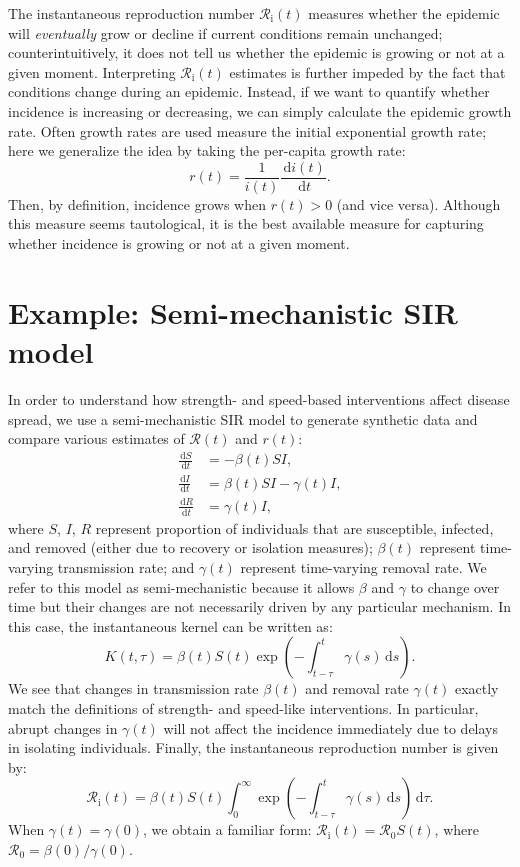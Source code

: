 \documentclass[12pt]{article}
\newcommand{\Rx}[1]{\ensuremath{{\mathcal R}_{#1}}\xspace}
\newcommand{\Ro}{\Rx{0}}
\newcommand{\Ri}{\Rx{\mathrm{i}}}
\newcommand{\RR}{\ensuremath{{\mathcal R}}\xspace}
\newcommand{\dd}[1]{\ensuremath{\, \mathrm{d}#1}}
\newcommand{\dtau}{\dd{\tau}}
\begin{document}
The instantaneous reproduction number $\Ri(t)$ measures whether the epidemic will \emph{eventually} grow or decline if current conditions remain unchanged;
counterintuitively, it does not tell us whether the epidemic is growing or not at a given moment.
Interpreting $\Ri(t)$ estimates is further impeded by the fact that conditions change during an epidemic.
Instead, if we want to quantify whether incidence is increasing or decreasing, we can simply calculate the epidemic growth rate.
Often growth rates are used measure the initial exponential growth rate; here we generalize the idea by taking the per-capita growth rate:
\begin{equation}
r(t) = \frac{1}{i(t)} \frac{\dd{i(t)}}{\dd{t}}.
\end{equation}
Then, by definition, incidence grows when $r(t) > 0$ (and vice versa).
Although this measure seems tautological, it is the best available measure for capturing whether incidence is growing or not at a given moment.

\section{Example: Semi-mechanistic SIR model}

In order to understand how strength- and speed-based interventions affect disease spread, we use a semi-mechanistic SIR model to generate synthetic data and compare various estimates of $\RR(t)$ and $r(t)$:
\begin{align}
\frac{\dd{S}}{\dd{t}} &= - \beta(t)S I, \label{eq:dSdt}\\
\frac{\dd{I}}{\dd{t}} &= \beta(t)S I - \gamma(t) I,\\
\frac{\dd{R}}{\dd{t}} &= \gamma(t) I,  \label{eq:dRdt}
\end{align}
where $S$, $I$, $R$ represent proportion of individuals that are susceptible, infected, and removed (either due to recovery or isolation measures);
$\beta(t)$ represent time-varying transmission rate; and $\gamma(t)$ represent time-varying removal rate.
We refer to this model as semi-mechanistic because it allows $\beta$ and $\gamma$ to change over time but their changes are not necessarily driven by any particular mechanism.
In this case, the instantaneous kernel can be written as:
\begin{equation}
K(t, \tau) = \beta(t) S(t) \exp\left(-\int_{t-\tau}^t \gamma(s) \dd{s} \right).
\end{equation}
We see that changes in transmission rate $\beta(t)$ and removal rate $\gamma(t)$ exactly match the definitions of strength- and speed-like interventions.
In particular, abrupt changes in $\gamma(t)$ will not affect the incidence immediately due to delays in isolating individuals.
Finally, the instantaneous reproduction number is given by:
\begin{equation}
\Ri(t) = \beta(t) S(t) \int_0^\infty \exp\left(-\int_{t-\tau}^t \gamma(s) \dd{s} \right) \dtau.
\end{equation}
When $\gamma(t) = \gamma(0)$, we obtain a familiar form: $\Ri(t) = \Ro S(t)$,
where $\Ro = \beta(0)/\gamma(0)$.
\end{document}
